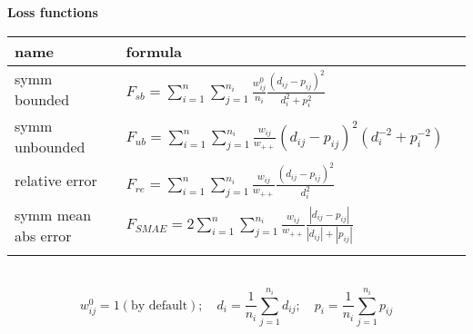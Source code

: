 \documentclass[12pt]{article}\usepackage{a4wide}
\begin{document}
\noindent
\begin{center}
{\large\bf Loss functions}\\[2mm]
\begin{tabular}{lll}\hline
name & formula\\ 
\hline
symm bounded & 
$F_{sb} = \sum_{i=1}^n \sum_{j=1}^{n_i} \frac{w_{ij}^0} {n_i} \frac{(d_{ij} - p_{ij})^2} {d_i^2 + p_i^2}$\\
	
symm unbounded & 
$F_{ub} = \sum_{i=1}^n \sum_{j=1}^{n_i} \frac{w_{ij}} {w_{++}} (d_{ij} - p_{ij})^2 (d_i^{-2} + p_i^{-2})$\\

relative error & 
$F_{re} = \sum_{i=1}^n \sum_{j=1}^{n_i} \frac{w_{ij}} {w_{++}} \frac{(d_{ij} - p_{ij})^2} {d_i^2}$\\
	
symm mean abs error &	
$F_{SMAE} = 2 \sum_{i=1}^n \sum_{j=1}^{n_i} \frac{w_{ij}} {w_{++}} \frac{|d _{ij}- p_{ij}|} {|d_{ij}| + |p_{ij}|}$\\	
\\
\hline
\end{tabular}\\

\[
  w_{ij}^0 = 1 (\mbox{by default});  \quad
  d_i = \frac{1}{n_i} \sum_{j=1}^{n_i} d_{ij}; \quad
  p_i = \frac{1}{n_i} \sum_{j=1}^{n_i} p_{ij}
\]
	
\end{center}
\end{document}
